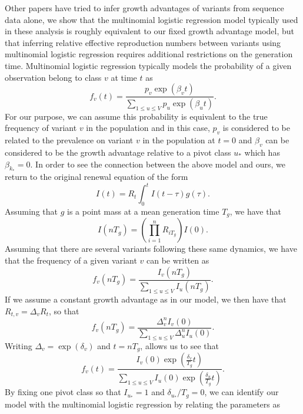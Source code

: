 \documentclass[11pt,oneside,letterpaper]{article}
\begin{document}
Other papers have tried to infer growth advantages of variants from sequence data alone, we show that the multinomial logistic regression model typically used in these analysis is roughly equivalent to our fixed growth advantage model, but that inferring relative effective reproduction numbers between variants using multinomial logistic regression requires additional restrictions on the generation time.
Multinomial logistic regression typically models the probability of a given observation belong to class $v$ at time $t$ as
\begin{equation}
  f_{v}(t) = \frac{p_{v}\exp(\beta_{v} t)}{\sum_{1\leq u\leq V} p_{u}\exp(\beta_{u} t)}.
\end{equation}
For our purpose, we can assume this probability is equivalent to the true frequency of variant $v$ in the population and in this case, $p_{v}$ is considered to be related to the prevalence on variant $v$ in the population at $t=0$ and $\beta_{v}$ can be considered to be the growth advantage relative to a pivot class $u_{*}$ which has $\beta_{k_{*}} = 0$.
In order to see the connection between the above model and ours, we return to the original renewal equation of the form
\begin{equation}
  I(t) = R_{t}\int_{0}^{t} I(t-\tau) g(\tau).
\end{equation}
Assuming that $g$  is a point mass at a mean generation time $T_{g}$, we have that
\begin{equation}
  I(nT_{g}) = \left(\prod_{i=1}^{n} R_{iT_{g}}\right) I(0).
\end{equation}
Assuming that there are several variants following these same dynamics, we have that the frequency of a given variant $v$ can be written as
\begin{equation}
  f_{v}(nT_{g}) = \frac{I_{v}(nT_{g})}{\sum_{1\leq u \leq V} I_{u}(nT_{g})}.
\end{equation}
If we assume a constant growth advantage as in our model, we then have that $R_{t,v} = \Delta_{v} R_{t}$, so that
\begin{equation}
  f_{v}(nT_{g}) =  \frac{\Delta_{v}^{n} I_{v}(0)}{\sum_{1\leq u \leq V} \Delta_{u}^{n} I_{u}(0)}.
\end{equation}
Writing $\Delta_{v} = \exp(\delta_{v})$ and $t = n T_{g}$, allows us to see that
\begin{equation}
  f_{v}(t) = \frac{I_{v}(0) \exp(\frac{\delta_{v}}{T_{g}} t)}{\sum_{1\leq u \leq V}I_{u}(0) \exp(\frac{\delta_{u}}{T_{g}} t)}.
\end{equation}
By fixing one pivot class so that $I_{u_{*}} = 1$ and $\delta_{u_{*}} / T_{g} = 0$, we can identify our model with the multinomial logistic regression by relating the parameters as
\end{document}
